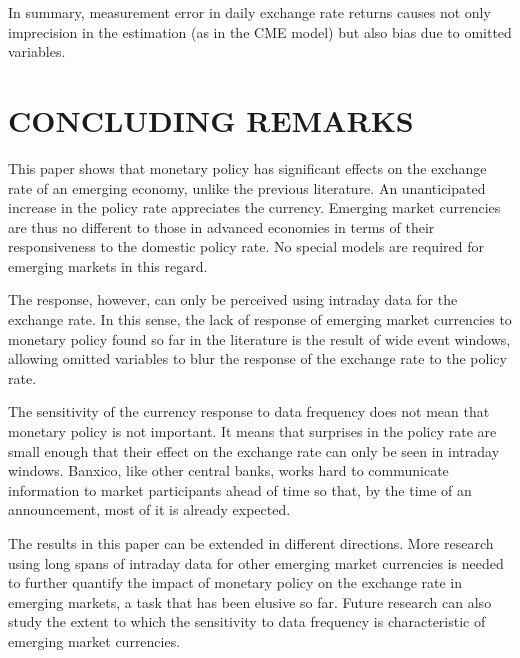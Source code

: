 \documentclass[a4paper,12pt]{article} 		%
\begin{document}
In summary, measurement error in daily exchange rate returns causes not only imprecision in the estimation (as in the CME model) but also bias due to omitted variables. 

\sectitlespace
\section{CONCLUDING REMARKS}\label{sec:conclusions}
\sectitlespace

This paper shows that monetary policy has significant effects on the exchange rate of an emerging economy, unlike the previous literature. An unanticipated increase in the policy rate appreciates the currency. Emerging market currencies are thus no different to those in advanced economies in terms of their responsiveness to the domestic policy rate. No special models are required for emerging markets in this regard. 

The response, however, can only be perceived using intraday data for the exchange rate. 
In this sense, the lack of response of emerging market currencies to monetary policy found so far in the literature is the result of wide event windows, allowing omitted variables to blur the response of the exchange rate to the policy rate. 

The sensitivity of the currency response to data frequency does not mean that monetary policy is not important. It means that surprises in the policy rate are small enough that their effect on the exchange rate can only be seen in intraday windows. Banxico, like other central banks, works hard to communicate information to market participants ahead of time so that, by the time of an announcement, most of it is already expected. 

The results in this paper can be extended in different directions. More research using long spans of intraday data for other emerging market currencies is needed to further quantify the impact of monetary policy on the exchange rate in emerging markets, a task that has been elusive so far. Future research can also study the extent to which the sensitivity to data frequency is characteristic of emerging market currencies. 
\end{document}
